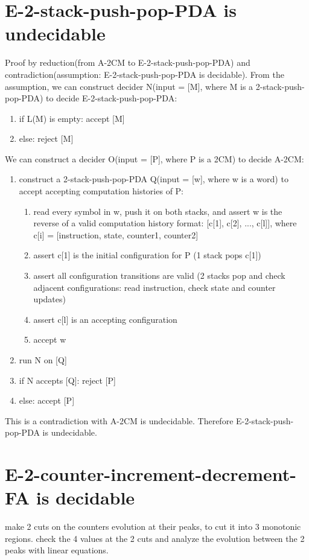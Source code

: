 \documentclass{article}
\begin{document}
\section{E-2-stack-push-pop-PDA is undecidable}
Proof by reduction(from A-2CM to E-2-stack-push-pop-PDA) and contradiction(assumption: E-2-stack-push-pop-PDA is decidable). From the assumption, we can construct decider N(input = [M], where M is a 2-stack-push-pop-PDA) to decide E-2-stack-push-pop-PDA:
\begin{enumerate}
	\item if L(M) is empty: accept [M]
	\item else: reject [M]
\end{enumerate}
We can construct a decider O(input = [P], where P is a 2CM) to decide A-2CM:
\begin{enumerate}
	\item construct a 2-stack-push-pop-PDA Q(input = [w], where w is a word) to 
	accept accepting computation histories of P:
	\begin{enumerate}
		\item read every symbol in w, push it on both stacks, and assert w is the reverse of a valid computation history format: [c[1], c[2], ..., c[l]], where c[i] = [instruction, state, counter1, counter2]
		\item assert c[1] is the initial configuration for P (1 stack pops c[1])
		\item assert all configuration transitions are valid (2 stacks pop and check adjacent configurations: read instruction, check state and counter updates)
		\item assert c[l] is an accepting configuration
		\item accept w
	\end{enumerate}
	\item run N on [Q]
	\item if N accepts [Q]: reject [P]
	\item else: accept [P]
\end{enumerate}
This is a contradiction with A-2CM is undecidable. Therefore E-2-stack-push-pop-PDA is undecidable.

\section{E-2-counter-increment-decrement-FA is decidable}
make 2 cuts on the counters evolution at their peaks, to cut it into 3 monotonic regions. check the 4 values at the 2 cuts and analyze the evolution between the 2 peaks with linear equations.
\end{document}
